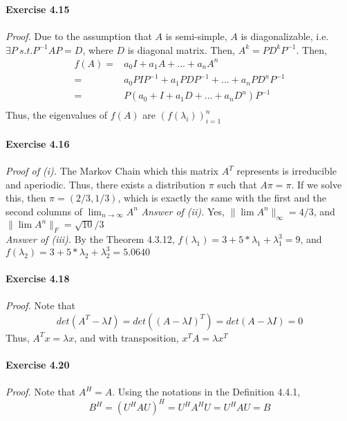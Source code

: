\documentclass[letterpaper,12pt]{article}
\theoremstyle{definition}
\begin{document}
\textbf{Exercise 4.15} \\\\
\emph{Proof.} Due to the assumption that $A$ is semi-simple, $A$ is diagonalizable, i.e. $\exists P \ s.t. P^{-1}AP = D$, where $D$ is diagonal matrix. Then, $A^k = P D^k P^{-1}$. Then,
\begin{align*}
 f(A) =& a_0 I + a_1 A + ... + a_n A^n  \\
    =& a_0 PIP^{-1} + a_1 PDP^{-1} + ... + a_n PD^{n}P^{-1} \\
   =& P(a_0 + I + a_1 D + ... + a_n D^n)P^{-1} \\
\end{align*}
Thus, the eigenvalues of $f(A)$ are $(f(\lambda_i))_{i=1}^{n}$ \\\\
\textbf{Exercise 4.16} \\\\
\emph{Proof of (i).} The Markov Chain which this matrix $A^T$ represents is irreducible and aperiodic. Thus, there exists a distribution $\pi$ such that $A \pi  = \pi$. If we solve this, then $\pi = (2/3,1/3) $, which is exactly the same with the first and the second columns of $\lim_{n \rightarrow \infty} A^n$
\newline
\emph{Answer of (ii).} Yes, $\| \lim A^n \|_{\infty} = 4/3 $, and $\| \lim A^n \|_{F} = \sqrt{10}/3$ \\
\emph{Answer of (iii).} By the Theorem 4.3.12, $f(\lambda_1) = 3 + 5*\lambda_1 + \lambda_{1}^{3} = 9$, and $f(\lambda_2) = 3 + 5*\lambda_2 + \lambda_{2}^{3} = 5.0640$ \\\\
\textbf{Exercise 4.18} \\\\
\emph{Proof.} Note that
\[det(A^T - \lambda I ) = det((A-\lambda I)^T) = det(A-\lambda I)=0\]
Thus, $A^T x = \lambda x$, and with transposition, $x^T A = \lambda x^T$ \\\\
\textbf{Exercise 4.20} \\\\
\emph{Proof. } Note that $A^H = A$. Using the notations in the Definition 4.4.1,
\[B^H = (U^H A U)^H = U^H A^H U = U^H A U = B \]
\end{document}
